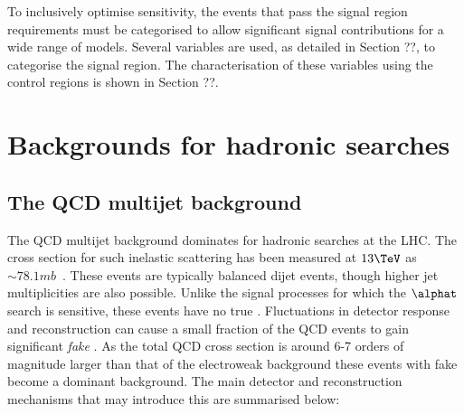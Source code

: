 To inclusively optimise sensitivity, the events that pass the signal region requirements 
must be categorised to allow significant signal contributions for a wide range of models. 
Several variables are used, as detailed in Section ??, to categorise the signal region. 
The characterisation of these variables using the control
regions is shown in Section ??.

\section{Backgrounds for hadronic searches}
\subsection{The QCD multijet background}
\label{sec:qcd-background-intro}
The QCD multijet background dominates for hadronic searches at the LHC. The cross section for such
inelastic scattering has been measured at $13\TeV$ as $\sim78.1mb$~\cite{inelast}. These events
are typically balanced dijet events, though higher jet multiplicities are also possible. 
Unlike the signal processes for which the $\alphat$ search is sensitive, these events have no
true \met. Fluctuations in detector response and reconstruction can cause a small fraction 
of the QCD events to gain significant \emph{fake} \met. As the total QCD cross section is 
around 6-7 orders of magnitude larger than that of the electroweak background these events with
fake \met become a dominant background. The main detector and reconstruction mechanisms that may introduce 
this \met are summarised below:
